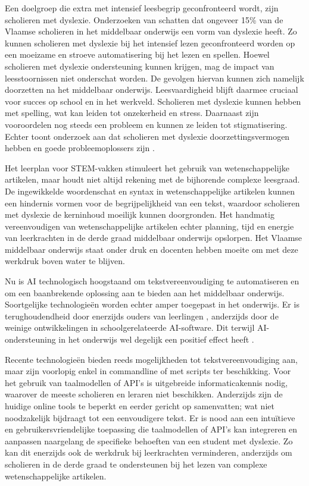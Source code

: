 Een doelgroep die extra met intensief leesbegrip geconfronteerd wordt, zijn scholieren met dyslexie. Onderzoeken van \textcite{Bonte2020, VanDerMeer2022} schatten dat ongeveer 15\% van de Vlaamse scholieren in het middelbaar onderwijs een vorm van dyslexie heeft. Zo kunnen scholieren met dyslexie bij het intensief lezen geconfronteerd worden op een moeizame en stroeve automatisering bij het lezen en spellen. Hoewel scholieren met dyslexie ondersteuning kunnen krijgen, mag de impact van leesstoornissen niet onderschat worden. De gevolgen hiervan kunnen zich namelijk doorzetten na het middelbaar onderwijs. Leesvaardigheid blijft daarmee cruciaal voor succes op school en in het werkveld. Scholieren met dyslexie kunnen hebben met spelling, wat kan leiden tot onzekerheid en stress. Daarnaast zijn vooroordelen nog steeds een probleem en kunnen ze leiden tot stigmatisering. Echter toont onderzoek aan dat scholieren met dyslexie doorzettingsvermogen hebben en goede probleemoplossers zijn \autocite{Ghesquiere2018, Lissens2020, Bonte2020}. 

\medspace

Het leerplan voor STEM-vakken stimuleert het gebruik van wetenschappelijke artikelen, maar houdt niet altijd rekening met de bijhorende complexe leesgraad. De ingewikkelde woordenschat en syntax in wetenschappelijke artikelen kunnen een hindernis vormen voor de begrijpelijkheid van een tekst, waardoor scholieren met dyslexie de kerninhoud moeilijk kunnen doorgronden. Het handmatig vereenvoudigen van wetenschappelijke artikelen echter planning, tijd en energie van leerkrachten in de derde graad middelbaar onderwijs opslorpen. Het Vlaamse middelbaar onderwijs staat onder druk en docenten hebben moeite om met deze werkdruk boven water te blijven. 

\medspace

Nu is AI technologisch hoogstaand om tekstvereenvoudiging te automatiseren en om een baanbrekende oplossing aan te bieden aan het middelbaar onderwijs. Soortgelijke technologieën worden echter amper toegepast in het onderwijs. Er is terughoudendheid door enerzijds ouders van leerlingen \autocite{Martens2021a}, anderzijds door de weinige ontwikkelingen in schoolgerelateerde AI-software. Dit terwijl AI-ondersteuning in het onderwijs wel degelijk een positief effect heeft \autocite{Belpaeme2018, Kraft2020}. 

\medspace

Recente technologieën bieden reeds mogelijkheden tot tekstvereenvoudiging aan, maar zijn voorlopig enkel in commandline of met scripts ter beschikking. Voor het gebruik van taalmodellen of API's is uitgebreide informaticakennis nodig, waarover de meeste scholieren en leraren niet beschikken. Anderzijds zijn de huidige online tools te beperkt en eerder gericht op samenvatten; wat niet noodzakelijk bijdraagt tot een eenvoudigere tekst. Er is nood aan een intuïtieve en gebruikersvriendelijke toepassing die taalmodellen of API's kan integreren en aanpassen naargelang de specifieke behoeften van een student met dyslexie. Zo kan dit enerzijds ook de werkdruk bij leerkrachten verminderen, anderzijds om scholieren in de derde graad te ondersteunen bij het lezen van complexe wetenschappelijke artikelen. 


